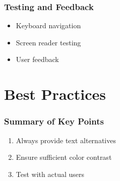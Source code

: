 \documentclass{ltx-talk}
\begin{document}
\begin{frame}
  \frametitle{Testing and Feedback}
  \begin{itemize}
    \item Keyboard navigation
    \item Screen reader testing
    \item User feedback
  \end{itemize}
\end{frame}

\section{Best Practices}

\begin{frame}
  \frametitle{Summary of Key Points}
  \begin{enumerate}
    \item Always provide text alternatives
    \item Ensure sufficient color contrast
    \item Test with actual users
  \end{enumerate}
\end{frame}
\end{document}
